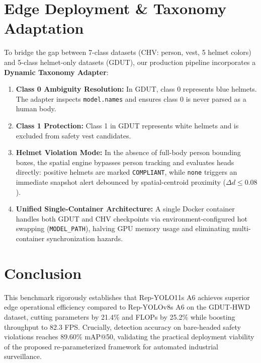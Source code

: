 \documentclass[conference]{IEEEtran}
\begin{document}
\section{Edge Deployment \& Taxonomy Adaptation}
To bridge the gap between 7-class datasets (CHV: person, vest, 5 helmet colors) and 5-class helmet-only datasets (GDUT), our production pipeline incorporates a \textbf{Dynamic Taxonomy Adapter}:
\begin{enumerate}
    \item \textbf{Class 0 Ambiguity Resolution:} In GDUT, class 0 represents blue helmets. The adapter inspects \texttt{model.names} and ensures class 0 is never parsed as a human body.
    \item \textbf{Class 1 Protection:} Class 1 in GDUT represents white helmets and is excluded from safety vest candidates.
    \item \textbf{Helmet Violation Mode:} In the absence of full-body person bounding boxes, the spatial engine bypasses person tracking and evaluates heads directly: positive helmets are marked \texttt{COMPLIANT}, while \texttt{none} triggers an immediate snapshot alert debounced by spatial-centroid proximity ($\Delta d \le 0.08$).
    \item \textbf{Unified Single-Container Architecture:} A single Docker container handles both GDUT and CHV checkpoints via environment-configured hot swapping (\texttt{MODEL\_PATH}), halving GPU memory usage and eliminating multi-container synchronization hazards.
\end{enumerate}

\section{Conclusion}
This benchmark rigorously establishes that Rep-YOLO11s A6 achieves superior edge operational efficiency compared to Rep-YOLOv8s A6 on the GDUT-HWD dataset, cutting parameters by 21.4\% and FLOPs by 25.2\% while boosting throughput to 82.3 FPS. Crucially, detection accuracy on bare-headed safety violations reaches 89.60\% mAP@50, validating the practical deployment viability of the proposed re-parameterized framework for automated industrial surveillance.
\end{document}
